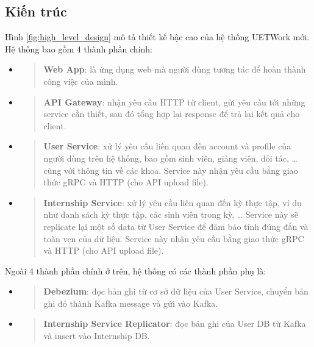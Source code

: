 \documentclass[./../main.tex]{subfiles}
\begin{document}
\subsection{Kiến trúc}

Hình \ref{fig:high_level_design} mô tả thiết kế bậc cao của hệ thống UETWork mới. Hệ thống bao gồm 4 thành phần chính:

\begin{itemize}
\item
  \begin{quote}
  \textbf{Web App}: là ứng dụng web mà người dùng tương tác để hoàn
  thành công việc của mình.
  \end{quote}
\item
  \begin{quote}
  \textbf{API Gateway}: nhận yêu cầu HTTP từ client, gửi yêu cầu tới
  những service cần thiết, sau đó tổng hợp lại response để trả lại kết
  quả cho client.
  \end{quote}
\item
  \begin{quote}
  \textbf{User Service}: xử lý yêu cầu liên quan đến account và profile
  của người dùng trên hệ thống, bao gồm sinh viên, giảng viên, đối tác,
  \ldots{} cùng với thông tin về các khoa. Service này nhận yêu cầu bằng
  giao thức gRPC và HTTP (cho API upload file).
  \end{quote}
\item
  \begin{quote}
  \textbf{Internship Service}: xử lý yêu cầu liên quan đến kỳ thực tập,
  ví dụ như danh sách kỳ thực tập, các sinh viên trong kỳ, \ldots{}
  Service này sẽ replicate lại một số data từ User Service để đảm bảo
  tính đúng đắn và toàn vẹn của dữ liệu. Service này nhận yêu cầu bằng
  giao thức gRPC và HTTP (cho API upload file).
  \end{quote}
\end{itemize}

Ngoài 4 thành phần chính ở trên, hệ thống có các thành phần phụ là:

\begin{itemize}
\item
  \begin{quote}
  \textbf{Debezium}: đọc bản ghi từ cơ sở dữ liệu của User Service,
  chuyển bản ghi đó thành Kafka message và gửi vào Kafka.
  \end{quote}
\item
  \begin{quote}
  \textbf{Internship Service Replicator}: đọc bản ghi của User DB từ
  Kafka và insert vào Internship DB.
  \end{quote}
\end{itemize}
\end{document}
